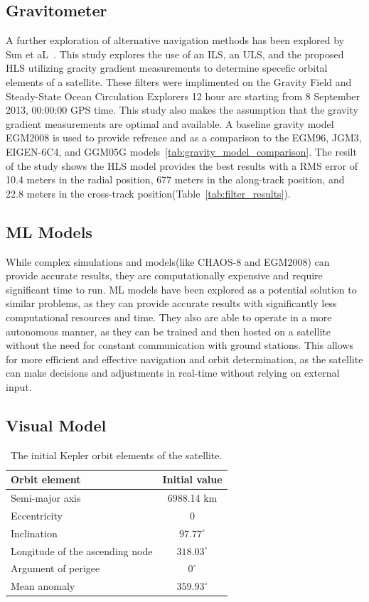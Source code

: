 \documentclass[conference]{IEEEtran}
\begin{document}
\subsection{Gravitometer}
A further exploration of alternative navigation methods has been explored by Sun et aL~\cite{sunLowEarthOrbitDetermination2016}. This study explores the use of an \ac{ILS}, an \ac{ULS}, and the proposed \ac{HLS} utilizing gracity gradient measurements to determine specefic orbital elements of a satellite. These filters were implimented on the Gravity Field and Steady-State Ocean Circulation Explorers 12 hour arc starting from 8 September 2013, 00:00:00 GPS time. This study also makes the assumption that the gravity gradient measurements are optimal and available. A baseline gravity model EGM2008 is used to provide refrence and as a comparison to the EGM96, JGM3, EIGEN-6C4, and GGM05G models~\ref{tab:gravity_model_comparison}. The resilt of the study shows the \ac{HLS} model provides the best results with a \ac{RMS} error of 10.4 meters in the radial position, 677 meters in the along-track position, and 22.8 meters in the cross-track position(Table~\ref{tab:filter_results}). 



\subsection{ML Models}
While complex simulations and models(like CHAOS-8 and EGM2008) can provide accurate results, they are computationally expensive and require significant time to run. \ac{ML} models have been explored as a potential solution to similar problems, as they can provide accurate results with significantly less computational resources and time. They also are able to operate in a more autonomous manner, as they can be trained and then hosted on a satellite without the need for constant communication with ground stations. This allows for more efficient and effective navigation and orbit determination, as the satellite can make decisions and adjustments in real-time without relying on external input.





\subsection{Visual Model}
\begin{table}[H]
\renewcommand{\arraystretch}{1.0}
\centering
\caption{The initial Kepler orbit elements of the satellite.}
\label{tab:orbit_elements}
\begin{tabular}{lc}
\hline
Orbit element & Initial value \\
\hline
Semi-major axis & 6988.14 km \\
Eccentricity & 0 \\
Inclination & $97.77^{\circ}$ \\
Longitude of the ascending node & $318.03^{\circ}$ \\
Argument of perigee & $0^{\circ}$ \\
Mean anomaly & $359.93^{\circ}$ \\
\hline
\end{tabular}
\end{table}
\end{document}

